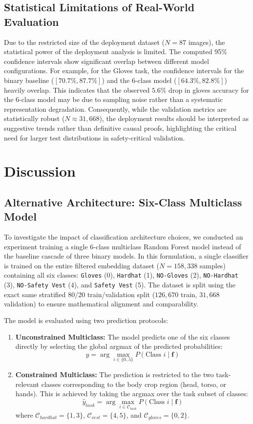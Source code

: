 \documentclass[11pt,a4paper]{article}
\begin{document}
\subsection{Statistical Limitations of Real-World Evaluation}
Due to the restricted size of the deployment dataset ($N=87$ images), the statistical power of the deployment analysis is limited. The computed 95\% confidence intervals show significant overlap between different model configurations. For example, for the Gloves task, the confidence intervals for the binary baseline ($[70.7\%, 87.7\%]$) and the 6-class model ($[64.3\%, 82.8\%]$) heavily overlap. This indicates that the observed $5.6\%$ drop in gloves accuracy for the 6-class model may be due to sampling noise rather than a systematic representation degradation. Consequently, while the validation metrics are statistically robust ($N \approx 31{,}668$), the deployment results should be interpreted as suggestive trends rather than definitive causal proofs, highlighting the critical need for larger test distributions in safety-critical validation.
\section{Discussion}
\subsection{Alternative Architecture: Six-Class Multiclass Model}
To investigate the impact of classification architecture choices, we conducted an experiment training a single 6-class multiclass Random Forest model instead of the baseline cascade of three binary models. In this formulation, a single classifier is trained on the entire filtered embedding dataset ($N = 158{,}338$ samples) containing all six classes: \texttt{Gloves} (0), \texttt{Hardhat} (1), \texttt{NO-Gloves} (2), \texttt{NO-Hardhat} (3), \texttt{NO-Safety Vest} (4), and \texttt{Safety Vest} (5). The dataset is split using the exact same stratified 80/20 train/validation split ($126{,}670$ train, $31{,}668$ validation) to ensure mathematical alignment and comparability.

The model is evaluated using two prediction protocols:
\begin{enumerate}
\item \textbf{Unconstrained Multiclass:} The model predicts one of the six classes directly by selecting the global argmax of the predicted probabilities:
\begin{equation}
\hat{y} = \arg\max_{i \in \{0..5\}} P(\text{Class } i \mid \mathbf{f})
\end{equation}
\item \textbf{Constrained Multiclass:} The prediction is restricted to the two task-relevant classes corresponding to the body crop region (head, torso, or hands). This is achieved by taking the argmax over the task subset of classes:
\begin{equation}
\hat{y}_{task} = \arg\max_{i \in \mathcal{C}_{task}} P(\text{Class } i \mid \mathbf{f})
\end{equation}
where $\mathcal{C}_{hardhat} = \{1, 3\}$, $\mathcal{C}_{vest} = \{4, 5\}$, and $\mathcal{C}_{gloves} = \{0, 2\}$.
\end{enumerate}
\end{document}
